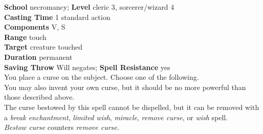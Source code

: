 \textbf{School} necromancy; \textbf{Level} cleric 3, sorcerer/wizard 4\\
\textbf{Casting Time} 1 standard action\\
\textbf{Components} V, S\\
\textbf{Range} touch\\
\textbf{Target} creature touched\\
\textbf{Duration} permanent\\
\textbf{Saving Throw }Will negates; \textbf{Spell Resistance} yes\\
You place a curse on the subject. Choose one of the following.\\
You may also invent your own curse, but it should be no more powerful than those described above.\\
The curse bestowed by this spell cannot be dispelled, but it can be removed with a \textit{break enchantment}, \textit{limited wish}, \textit{miracle}, \textit{remove curse}, or \textit{wish }spell.\\
\textit{Bestow curse }counters \textit{remove curse}.\\
